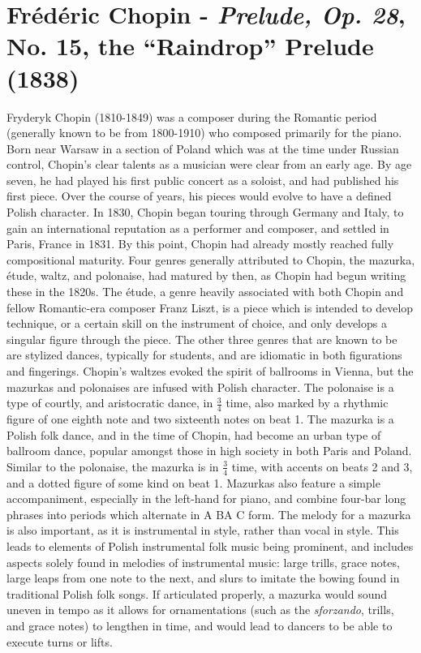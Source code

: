 \chapter[Chopin and Prelude, Op. 28, No. 15]{Frédéric Chopin - \textit{Prelude, Op. 28}, No. 15, the ``Raindrop'' Prelude (1838)}

Fryderyk Chopin (1810-1849) was a composer during the Romantic period (generally known to be from 1800-1910) who composed primarily for the piano. Born near Warsaw in a section of Poland which was at the time under Russian control, Chopin's clear talents as a musician were clear from an early age. By age seven, he had played his first public concert as a soloist, and had published his first piece. Over the course of years, his pieces would evolve to have a defined Polish character. In 1830, Chopin began touring through Germany and Italy, to gain an international reputation as a performer and composer, and settled in Paris, France in 1831. By this point, Chopin had already mostly reached fully compositional maturity. Four genres generally attributed to Chopin, the mazurka, étude, waltz, and polonaise, had matured by then, as Chopin had begun writing these in the 1820s\autocite{Burkholder_Grout_Palisca_2014}. The étude, a genre heavily associated with both Chopin and fellow Romantic-era composer Franz Liszt, is a piece which is intended to develop technique, or a certain skill on the instrument of choice, and only develops a singular figure through the piece. The other three genres that are known to be  are stylized dances, typically for students, and are idiomatic in both figurations and fingerings\autocite{Burkholder_Grout_Palisca_2014}. Chopin's waltzes evoked the spirit of ballrooms in Vienna, but the mazurkas and polonaises are infused with Polish character. The polonaise is a type of courtly, and aristocratic dance, in $\frac{3}{4}$ time, also marked by a rhythmic figure of one eighth note and two sixteenth notes on beat 1. The mazurka is a Polish folk dance, and in the time of Chopin, had become an urban type of ballroom dance, popular amongst those in high society in both Paris and Poland. Similar to the polonaise, the mazurka is in $\frac{3}{4}$ time, with accents on beats 2 and 3, and a dotted figure of some kind on beat 1. Mazurkas also feature a simple accompaniment, especially in the left-hand for piano, and combine four-bar long phrases into periods which alternate in A BA C form. The melody for a mazurka is also important, as it is instrumental in style, rather than vocal in style. This leads to elements of Polish instrumental folk music being prominent, and includes aspects solely found in melodies of instrumental music: large trills, grace notes, large leaps from one note to the next, and slurs to imitate the bowing found in traditional Polish folk songs. If articulated properly, a mazurka would sound uneven in tempo as it allows for ornamentations (such as the \textit{sforzando}, trills, and grace notes) to lengthen in time, and would lead to dancers to be able to execute turns or lifts. 

